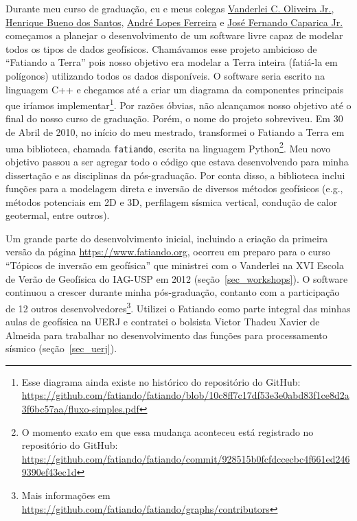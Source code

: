 \documentclass[10pt,a4paper,oneside]{book}
\begin{document}
Durante meu curso de graduação, eu e meus colegas
\href{https://www.pinga-lab.org/people/oliveira-jr.html}{Vanderlei C. Oliveira Jr.},
\href{https://www.linkedin.com/in/hbuenos/}{Henrique Bueno dos Santos},
\href{https://www.linkedin.com/in/andr%C3%A9-ferreira-lopes/}{André Lopes Ferreira} e
\href{https://www.linkedin.com/in/josecaparica/}{José Fernando Caparica Jr.}
começamos a planejar o desenvolvimento de um software livre capaz de modelar
todos os tipos de dados geofísicos.
Chamávamos esse projeto ambicioso de ``Fatiando a Terra'' pois nosso objetivo
era modelar a Terra inteira (fatiá-la em polígonos) utilizando todos os dados
disponíveis.
O software seria escrito na linguagem C++ e chegamos até a criar um diagrama
da componentes principais que iríamos implementar\footnote{Esse diagrama ainda
existe no histórico do repositório do GitHub: \url{https://github.com/fatiando/fatiando/blob/10c8ff7c17df53e3e0abd83f1ce8d2a3f6bc57aa/fluxo-simples.pdf}}.
Por razões óbvias, não alcançamos nosso objetivo até o final do nosso curso de
graduação.
Porém, o nome do projeto sobreviveu.
Em 30 de Abril de 2010, no início do
meu mestrado, transformei o Fatiando a Terra em uma biblioteca, chamada
\texttt{fatiando}, escrita na linguagem Python\footnote{O momento exato em que
essa mudança aconteceu está registrado no repositório do GitHub:
\url{https://github.com/fatiando/fatiando/commit/928515b0fcfdccecbc4f661ed2469390ef43ec1d}}.
Meu novo objetivo passou a ser agregar todo o código que estava desenvolvendo
para minha dissertação e as disciplinas da pós-graduação.
Por conta disso, a biblioteca inclui funções para a modelagem direta e inversão
de diversos métodos geofísicos (e.g., métodos potenciais em 2D e 3D, perfilagem
sísmica vertical, condução de calor geotermal, entre outros).

Um grande parte do desenvolvimento inicial, incluindo a criação da primeira
versão da página \url{https://www.fatiando.org}, ocorreu em preparo para o
curso ``Tópicos de inversão em geofísica'' que ministrei com o Vanderlei na XVI
Escola de Verão de Geofísica do IAG-USP em 2012 (seção~\ref{sec_workshops}).
O software continuou a crescer durante minha pós-graduação, contanto com a
participação de 12 outros desenvolvedores\footnote{Mais informações em
\url{https://github.com/fatiando/fatiando/graphs/contributors}}.
Utilizei o Fatiando como parte integral das minhas aulas de geofísica na
UERJ e contratei o bolsista Victor Thadeu Xavier de Almeida para trabalhar no
desenvolvimento das funções para processamento sísmico (seção~\ref{sec_uerj}).
\end{document}
